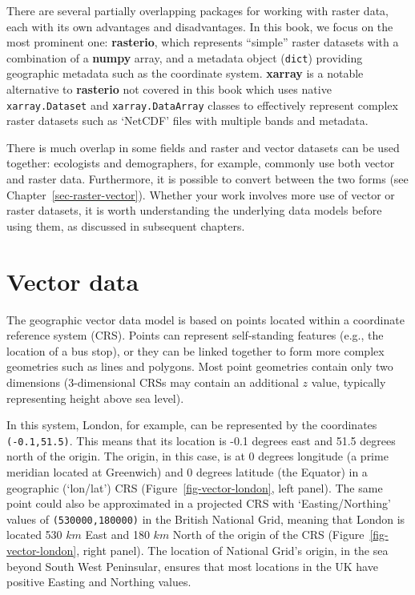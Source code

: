 \documentclass[
  letterpaper,
]{krantz}
\begin{document}
There are several partially overlapping packages for working with raster
data, each with its own advantages and disadvantages. In this book, we
focus on the most prominent one: \textbf{rasterio}, which represents
``simple'' raster datasets with a combination of a \textbf{numpy} array,
and a metadata object (\texttt{dict}) providing geographic metadata such
as the coordinate system. \textbf{xarray} is a notable alternative to
\textbf{rasterio} not covered in this book which uses native
\texttt{xarray.Dataset} and \texttt{xarray.DataArray} classes to
effectively represent complex raster datasets such as `NetCDF' files
with multiple bands and metadata.

There is much overlap in some fields and raster and vector datasets can
be used together: ecologists and demographers, for example, commonly use
both vector and raster data. Furthermore, it is possible to convert
between the two forms (see Chapter~\ref{sec-raster-vector}). Whether
your work involves more use of vector or raster datasets, it is worth
understanding the underlying data models before using them, as discussed
in subsequent chapters.

\section{Vector data}\label{sec-vector-data}

The geographic vector data model is based on points located within a
coordinate reference system (CRS). Points can represent self-standing
features (e.g., the location of a bus stop), or they can be linked
together to form more complex geometries such as lines and polygons.
Most point geometries contain only two dimensions (3-dimensional CRSs
may contain an additional \(z\) value, typically representing height
above sea level).

In this system, London, for example, can be represented by the
coordinates \texttt{(-0.1,51.5)}. This means that its location is -0.1
degrees east and 51.5 degrees north of the origin. The origin, in this
case, is at 0 degrees longitude (a prime meridian located at Greenwich)
and 0 degrees latitude (the Equator) in a geographic (`lon/lat') CRS
(Figure~\ref{fig-vector-london}, left panel). The same point could also
be approximated in a projected CRS with `Easting/Northing' values of
\texttt{(530000,180000)} in the British National Grid, meaning that
London is located 530 \(km\) East and 180 \(km\) North of the origin of
the CRS (Figure~\ref{fig-vector-london}, right panel). The location of
National Grid's origin, in the sea beyond South West Peninsular, ensures
that most locations in the UK have positive Easting and Northing values.
\end{document}
